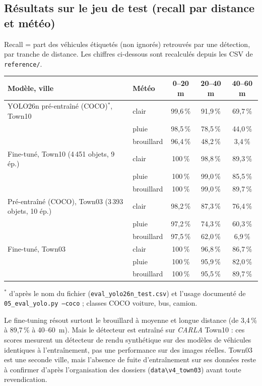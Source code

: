 \documentclass[11pt,a4paper]{article}
\newcommand{\code}[1]{\texttt{#1}}
\begin{document}
\subsection{R\'esultats sur le jeu de test (recall par distance et m\'et\'eo)}
Recall = part des v\'ehicules \'etiquet\'es (non ignor\'es) retrouv\'es par une d\'etection, par tranche de distance. Les chiffres ci-dessous
sont recalcul\'es depuis les CSV de \code{reference/}.
\begin{center}\small\begin{tabular}{@{}llccc@{}}\toprule
Mod\`ele, ville & M\'et\'eo & 0--20 m & 20--40 m & 40--60 m \\\midrule
YOLO26n pr\'e-entra\^in\'e (COCO)$^{*}$, Town10 & clair & 99,6\,\% & 91,9\,\% & 69,7\,\% \\
 & pluie & 98,5\,\% & 78,5\,\% & 44,0\,\% \\
 & brouillard & 96,4\,\% & 48,2\,\% & 3,4\,\% \\\midrule
Fine-tun\'e, Town10 (4\,451 objets, 9 \'ep.) & clair & 100\,\% & 98,8\,\% & 89,3\,\% \\
 & pluie & 100\,\% & 99,0\,\% & 85,5\,\% \\
 & brouillard & 100\,\% & 99,0\,\% & 89,7\,\% \\\midrule
Pr\'e-entra\^in\'e (COCO), Town03 (3\,393 objets, 10 \'ep.) & clair & 98,2\,\% & 87,3\,\% & 76,4\,\% \\
 & pluie & 97,2\,\% & 74,3\,\% & 60,3\,\% \\
 & brouillard & 97,5\,\% & 62,0\,\% & 6,9\,\% \\\midrule
Fine-tun\'e, Town03 & clair & 100\,\% & 96,8\,\% & 86,7\,\% \\
 & pluie & 100\,\% & 95,9\,\% & 82,0\,\% \\
 & brouillard & 100\,\% & 95,5\,\% & 89,7\,\% \\
\bottomrule\end{tabular}\end{center}
{\footnotesize $^{*}$ d'apr\`es le nom du fichier (\code{eval\_yolo26n\_test.csv}) et l'usage document\'e de \code{05\_eval\_yolo.py --coco} ; classes COCO voiture, bus, camion.}

\begin{honnete}
Le fine-tuning r\'esout surtout le brouillard \`a moyenne et longue distance (de 3,4\,\% \`a 89,7\,\% \`a 40--60~m). Mais le d\'etecteur est
entra\^in\'e sur \emph{CARLA} Town10 : ces scores mesurent un d\'etecteur de rendu synth\'etique sur des mod\`eles de v\'ehicules
identiques \`a l'entra\^inement, pas une performance sur des images r\'eelles. Town03 est une seconde ville, mais l'absence de fuite
d'entra\^inement sur ses donn\'ees reste \`a confirmer d'apr\`es l'organisation des dossiers (\code{data\textbackslash v4\_town03}) avant toute revendication.
\end{honnete}
\end{document}
